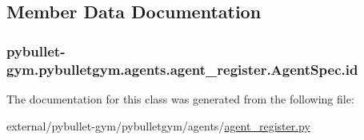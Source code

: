 \subsection{Member Data Documentation}
\subsubsection[{\texorpdfstring{id}{id}}]{\setlength{\rightskip}{0pt plus 5cm}pybullet-\/gym.\+pybulletgym.\+agents.\+agent\+\_\+register.\+Agent\+Spec.\+id}\hypertarget{classpybullet-gym_1_1pybulletgym_1_1agents_1_1agent__register_1_1_agent_spec_ac2ec74e88af7e0f3ee2151cb06b46897}{}\label{classpybullet-gym_1_1pybulletgym_1_1agents_1_1agent__register_1_1_agent_spec_ac2ec74e88af7e0f3ee2151cb06b46897}


The documentation for this class was generated from the following file\+:\begin{DoxyCompactItemize}
\item 
external/pybullet-\/gym/pybulletgym/agents/\hyperlink{agent__register_8py}{agent\+\_\+register.\+py}\end{DoxyCompactItemize}

